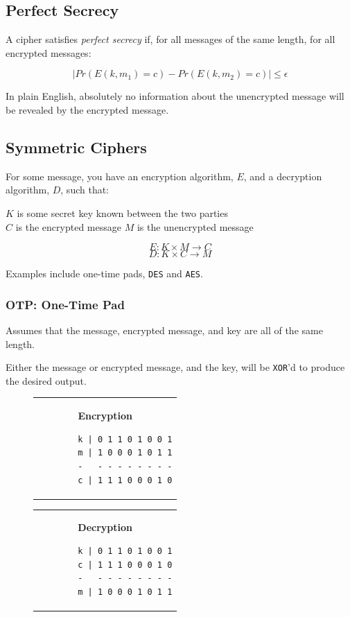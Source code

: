 \documentclass{article}
\begin{document}
\subsection{Perfect Secrecy}

A cipher satisfies \textit{perfect secrecy} if, for all messages of the same length, for all encrypted messages:

\[ | Pr(E(k, m_1) = c) - Pr(E(k, m_2) = c) | \leq \epsilon \]

In plain English, absolutely no information about the unencrypted message will be revealed by the encrypted message.

\subsection{Symmetric Ciphers}

For some message, you have an encryption algorithm, $E$, and a decryption algorithm, $D$, such that:
\vspace{.5cm}
\begin{center}
  $K$ is some secret key known between the two parties\\
  $C$ is the encrypted message
  $M$ is the unencrypted message
\end{center}

\[ E : K \times M \rightarrow C\]
\[ D : K \times C \rightarrow M\]

Examples include one-time pads, \texttt{DES} and \texttt{AES}.

\subsubsection{OTP: One-Time Pad}

Assumes that the message, encrypted message, and key are all of the same length.

Either the message or encrypted message, and the key, will be \texttt{XOR}'d to produce the desired output.

\begin{figure}[!htb]
  \begin{minipage}{0.5\textwidth}
    \begin{tabular}{c}
      \textbf{Encryption}
      \begin{lstlisting}
        k | 0 1 1 0 1 0 0 1
        m | 1 0 0 0 1 0 1 1
        -   - - - - - - - -
        c | 1 1 1 0 0 0 1 0
      \end{lstlisting}
    \end{tabular}
  \end{minipage}%
  \begin{minipage}{0.5\textwidth}
    \begin{tabular}{c}
      \textbf{Decryption}
      \begin{lstlisting}
        k | 0 1 1 0 1 0 0 1
        c | 1 1 1 0 0 0 1 0
        -   - - - - - - - -
        m | 1 0 0 0 1 0 1 1
      \end{lstlisting}
    \end{tabular}
  \end{minipage}%
\end{figure}
\end{document}
